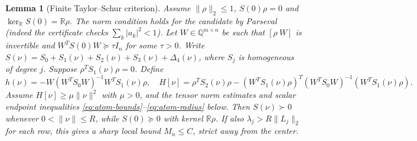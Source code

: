 \documentclass[11pt]{article}
\newtheorem{lemma}[theorem]{Lemma}
\newcommand{\R}{\mathbb R}
\newcommand{\Q}{\mathbb Q}
\begin{document}
\begin{lemma}[Finite Taylor--Schur criterion]\label{lem:atomcriterion}
Assume $\|\rho\|_2\le1$, $S(0)\rho=0$ and
$\ker_\R S(0)=\R\rho$. The norm condition holds for the candidate
by Parseval (indeed the certificate checks $\sum_k|a_k|^2<1$).  Let $W\in\Q^{m\times n}$ be such that $[\rho\ W]$ is invertible and
$W^TS(0)W\succeq\tau I_n$ for some $\tau>0$.  Write
$S(\nu)=S_0+S_1(\nu)+S_2(\nu)+S_3(\nu)+\Delta_4(\nu)$,
where $S_j$ is homogeneous of degree $j$.  Suppose $\rho^TS_1(\nu)\rho=0$.  Define
\[
 h(\nu)=-W(W^TS_0W)^{-1}W^TS_1(\nu)\rho,
 \quad H[\nu]=\rho^TS_2(\nu)\rho-
 (W^TS_1(\nu)\rho)^T(W^TS_0W)^{-1}(W^TS_1(\nu)\rho).
\]
Assume $H[\nu]\ge\mu\|\nu\|^2$ with $\mu>0$, and the tensor norm estimates and scalar endpoint inequalities \eqref{eq:atom-bounds}--\eqref{eq:atom-radius} below.  Then $S(\nu)\succ0$ whenever $0<\|\nu\|\le R$, while $S(0)\succeq0$ with kernel $\R\rho$.  If also $\lambda_j>R\|L_j\|_2$ for each row, this gives a sharp local bound $M_n\le C$, strict away from the center.
\end{lemma}
\end{document}
